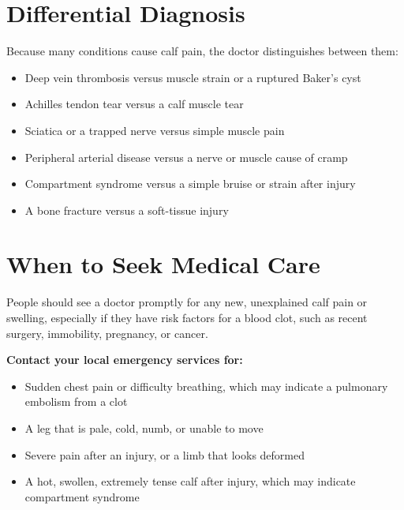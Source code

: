 \section*{Differential Diagnosis}
Because many conditions cause calf pain, the doctor distinguishes between them:
\begin{itemize}
    \item Deep vein thrombosis versus muscle strain or a ruptured Baker's cyst
    \item Achilles tendon tear versus a calf muscle tear
    \item Sciatica or a trapped nerve versus simple muscle pain
    \item Peripheral arterial disease versus a nerve or muscle cause of cramp
    \item Compartment syndrome versus a simple bruise or strain after injury
    \item A bone fracture versus a soft-tissue injury
\end{itemize}

\section*{When to Seek Medical Care}
People should see a doctor promptly for any new, unexplained calf pain or swelling, especially if they have risk factors for a blood clot, such as recent surgery, immobility, pregnancy, or cancer.

\textbf{Contact your local emergency services for:}
\begin{itemize}
    \item Sudden chest pain or difficulty breathing, which may indicate a pulmonary embolism from a clot
    \item A leg that is pale, cold, numb, or unable to move
    \item Severe pain after an injury, or a limb that looks deformed
    \item A hot, swollen, extremely tense calf after injury, which may indicate compartment syndrome
\end{itemize}

